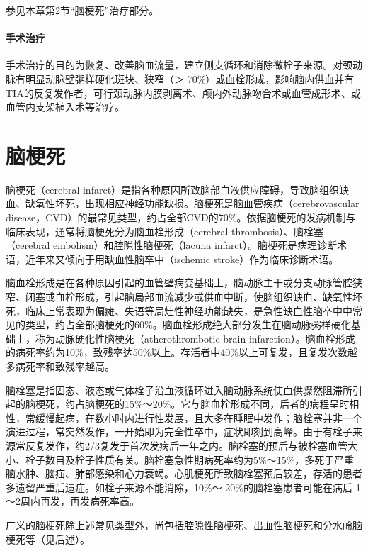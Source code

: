 参见本章第2节“脑梗死”治疗部分。

\paragraph{手术治疗}

手术治疗的目的为恢复、改善脑血流量，建立侧支循环和消除微栓子来源。对颈动脉有明显动脉壁粥样硬化斑块、狭窄（＞
70\%）或血栓形成，影响脑内供血并有TIA的反复发作者，可行颈动脉内膜剥离术、颅内外动脉吻合术或血管成形术、或血管内支架植入术等治疗。

\protect\hypertarget{text00242.html}{}{}

\section{脑梗死}

脑梗死（cerebral
infarct）是指各种原因所致脑部血液供应障碍，导致脑组织缺血、缺氧性坏死，出现相应神经功能缺损。脑梗死是脑血管疾病（cerebrovascular
disease，CVD）的最常见类型，约占全部CVD的70\%。依据脑梗死的发病机制与临床表现，通常将脑梗死分为脑血栓形成（cerebral
thrombosis）、脑栓塞（cerebral embolism）和腔隙性脑梗死（lacuna
infarct）。脑梗死是病理诊断术语，近年来又倾向于用缺血性脑卒中（ischemic
stroke）作为临床诊断术语。

脑血栓形成是在各种原因引起的血管壁病变基础上，脑动脉主干或分支动脉管腔狭窄、闭塞或血栓形成，引起脑局部血流减少或供血中断，使脑组织缺血、缺氧性坏死，临床上常表现为偏瘫、失语等局灶性神经功能缺失，是急性缺血性脑卒中中常见的类型，约占全部脑梗死的60\%。脑血栓形成绝大部分发生在脑动脉粥样硬化基础上，称为动脉硬化性脑梗死（atherothrombotic
brain
infarction）。脑血栓形成的病死率约为10\%，致残率达50\%以上。存活者中40\%以上可复发，且复发次数越多病死率和致残率越高。

脑栓塞是指固态、液态或气体栓子沿血液循环进入脑动脉系统使血供骤然阻滞所引起的脑梗死，约占脑梗死的15\%～20\%。它与脑血栓形成不同，后者的病程呈时相性，常缓慢起病，在数小时内进行性发展，且大多在睡眠中发作；脑栓塞并非一个演进过程，常突然发作，一开始即为完全性卒中，症状即刻到高峰。由于有栓子来源常反复发作，约2/3复发于首次发病后一年之内。脑栓塞的预后与被栓塞血管大小、栓子数目及栓子性质有关。脑栓塞急性期病死率约为5\%～15\%，多死于严重脑水肿、脑疝、肺部感染和心力衰竭。心肌梗死所致脑栓塞预后较差，存活的患者多遗留严重后遗症。如栓子来源不能消除，10\%～
20\%的脑栓塞患者可能在病后 1～2周内再发，再发病死率高。

广义的脑梗死除上述常见类型外，尚包括腔隙性脑梗死、出血性脑梗死和分水岭脑梗死等（见后述）。

